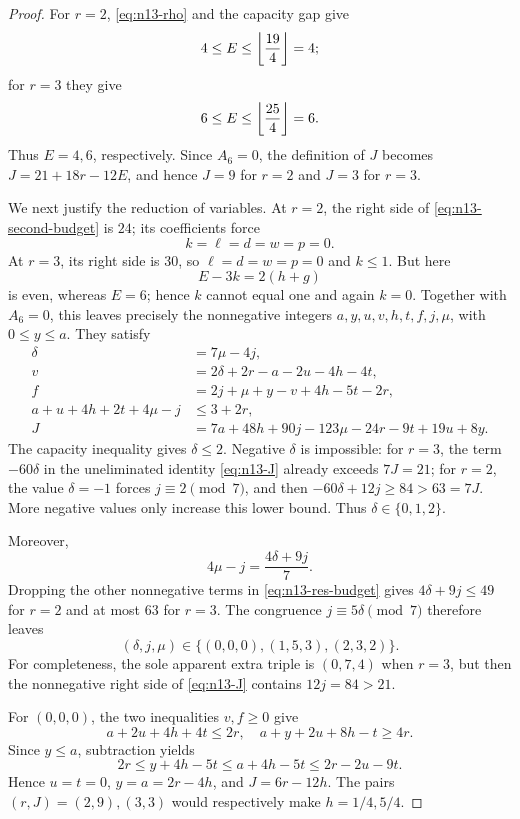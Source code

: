 \begin{proof}
For $r=2$, \eqref{eq:n13-rho} and the capacity gap give
\[
 4\leq E\leq\left\lfloor \frac{19}{4}\right\rfloor=4;
\]
for $r=3$ they give
\[
 6\leq E\leq\left\lfloor \frac{25}{4}\right\rfloor=6.
\]
Thus $E=4,6$, respectively.  Since $A_6=0$, the definition of $J$ becomes
$J=21+18r-12E$, and hence $J=9$ for $r=2$ and $J=3$ for $r=3$.

We next justify the reduction of variables.  At $r=2$, the right side of
\eqref{eq:n13-second-budget} is $24$; its coefficients force
\[
 k=\ell=d=w=p=0.
\]
At $r=3$, its right side is $30$, so
$\ell=d=w=p=0$ and $k\leq1$.  But here
\[
 E-3k=2(h+g)
\]
is even, whereas $E=6$; hence $k$ cannot equal one and again $k=0$.
Together with $A_6=0$, this leaves precisely the nonnegative integers
$a,y,u,v,h,t,f,j,\mu$, with $0\leq y\leq a$.  They satisfy
\begin{align}
 \delta&=7\mu-4j,                                  \label{eq:n13-res-delta}\\
 v&=2\delta+2r-a-2u-4h-4t,\nonumber\\
 f&=2j+\mu+y-v+4h-5t-2r,                           \label{eq:n13-res-vf}\\
 a+u+4h+2t+4\mu-j&\leq3+2r,                       \label{eq:n13-res-budget}\\
 J&=7a+48h+90j-123\mu-24r-9t+19u+8y.             \label{eq:n13-res-J}
\end{align}
The capacity inequality gives $\delta\leq2$.  Negative $\delta$ is
impossible: for $r=3$, the term $-60\delta$ in the uneliminated identity
\eqref{eq:n13-J} already exceeds $7J=21$; for $r=2$, the value
$\delta=-1$ forces $j\equiv2\pmod7$, and then
$-60\delta+12j\geq84>63=7J$.  More negative values only increase this
lower bound.  Thus $\delta\in\{0,1,2\}$.

Moreover,
\[
 4\mu-j=\frac{4\delta+9j}{7}.
\]
Dropping the other nonnegative terms in \eqref{eq:n13-res-budget} gives
$4\delta+9j\leq49$ for $r=2$ and at most $63$ for $r=3$.  The congruence
$j\equiv5\delta\pmod7$ therefore leaves
\begin{equation}
 (\delta,j,\mu)\in\{(0,0,0),(1,5,3),(2,3,2)\}.    \label{eq:n13-three-residues}
\end{equation}
For completeness, the sole apparent extra triple is $(0,7,4)$ when
$r=3$, but then the nonnegative right side of \eqref{eq:n13-J} contains
$12j=84>21$.

For $(0,0,0)$, the two inequalities $v,f\geq0$ give
\[
 a+2u+4h+4t\leq2r,\quad
 a+y+2u+8h-t\geq4r.
\]
Since $y\leq a$, subtraction yields
\[
 2r\leq y+4h-5t\leq a+4h-5t\leq2r-2u-9t.
\]
Hence $u=t=0$, $y=a=2r-4h$, and
$J=6r-12h$.  The pairs $(r,J)=(2,9),(3,3)$ would respectively make
$h=1/4,5/4$.


\end{proof}
